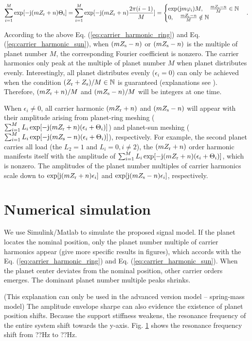 \documentclass[a4paper,fleqn]{cas-sc}%
\begin{document}
\begin{equation}
    \sum_{i=1}^{M} \exp[-{\rm j} (m Z_{\rm r} + n)\Theta_i]=\sum_{i=1}^{M} \exp[-{\rm j}(m Z_{\rm r}+n)\frac{2 \pi (i-1)}{M}]=\begin{cases}
        \exp({\rm j} m \varphi_i) M, \quad \frac{m Z_{\rm s}-n}{M} \in \mathbb{N}\\
        0, \quad \frac{m Z_{\rm r}-n}{M} \notin \mathbb{N}
    \end{cases}.\label{eq:carrier_harmonic_sun}
\end{equation}
\par According to the above Eq. (\ref{eq:carrier_harmonic_ring}) and Eq. (\ref{eq:carrier_harmonic_sun}), when $(m Z_{\rm s}-n)$ or $(m Z_{\rm s}-n)$ is the multiple of planet number $M$, the corresponding Fourier coefficient is nonzero. The carrier harmonics only peak at the multiple of planet number $M$ when planet distributes evenly. Interestingly, all planet distributes evenly ($\epsilon_i=0$) can only be achieved when the condition $(Z_{\rm r}+Z_{\rm s})/M \in \mathbb{N}$ is guaranteed (explanations see ). Therefore, $(m Z_{\rm r}+n)/M$ and $(m Z_{\rm s}-n)/M$ will be integers at one time. 
\par When $\epsilon_i \neq 0$, all carrier harmonic $(m Z_{\rm r} + n)$ and $(m Z_{\rm s} - n)$ will appear with their amplitude arising from planet-ring meshing ($\sum_{i=1}^{M} L_i \exp[-{\rm j} (m Z_{\rm r} + n)(\epsilon_i+\Theta_i)]$) and planet-sun meshing ($\sum_{i=1}^{M} L_i \exp[-{\rm j} (m Z_{\rm s} - n)(\epsilon_i+\Theta_i)]$), respectively. For example, the second planet carries all load (the $L_2=1$ and $L_i=0,i\neq2$), the $(m Z_{\rm r} + n)$ order harmonic manifests itself with the amplitude of $\sum_{i=1}^{M} L_i \exp[-{\rm j} (m Z_{\rm r} + n)(\epsilon_i+\Theta_i)]$, which is nonzero. The amplitudes of the planet number multiples of carrier harmonics scale down to $\exp[{\rm j}(m Z_{\rm r}+n)\epsilon_i]$ and $\exp[{\rm j}(m Z_{\rm s}-n)\epsilon_i]$, respectively.
\section{Numerical simulation}
\par We use Simulink/Matlab to simulate the proposed signal model. If the planet locates the nominal position, only the planet number multiple of carrier harmonics appear (give more specific results in figures), which accords with the Eq. (\ref{eq:carrier_harmonic_ring}) and Eq. (\ref{eq:carrier_harmonic_sun}). When the planet center deviates from the nominal position, other carrier orders emerges.  The dominant planet number multiple peaks shrinks. 
\par (This explanation can only be used in the advanced version model -- spring-mass model) The amplitude envelope sharpe can also evidence the existence of planet position shifts. Because the support stiffness weakens, the resonance frequency of the entire system shift towards the y-axis. Fig. \ref{} shows the resonance frequency shift from ??Hz to ??Hz.
\end{document}
